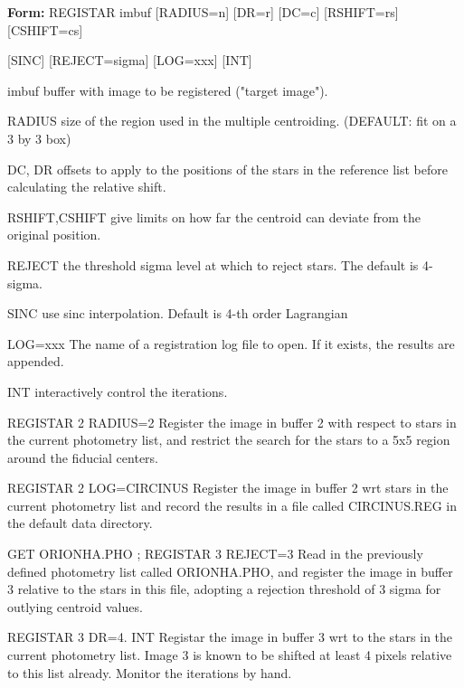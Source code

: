 {\newpage\clearpage
{}%
\begin{command}
  \item[\textbf{Form: } REGISTAR imbuf {[RADIUS=n]} {[DR=r]} {[DC=c]} 
       {[RSHIFT=rs]} {[CSHIFT=cs]}\hfill]{}
       \item{{[SINC]} {[REJECT=sigma]} {[LOG=xxx]} {[INT]}}
  \item[imbuf]{buffer with image to be registered ("target image").}
  \item[RADIUS]{size of the region used in the multiple centroiding.
       (DEFAULT: fit on a 3 by 3 box)}
  \item[DC, DR]{offsets to apply to the positions of the stars in the
       reference list before calculating the relative shift.}
  \item[RSHIFT,CSHIFT]{give limits on how far the centroid can deviate 
       from the original position.}
  \item[REJECT]{the threshold sigma level at which to reject stars. The
       default is 4-sigma.}
  \item[SINC]{use sinc interpolation. Default is 4-th order Lagrangian}
  \item[LOG=xxx]{The name of a registration log file to open.  If it exists,
       the results are appended.  }
  \item[INT]{interactively control the iterations.}
\end{command}%
\lthtmlfigureZ
\lthtmlcheckvsize\clearpage}

{\newpage\clearpage
{}%
\begin{example}
  \item[REGISTAR 2 RADIUS=2\hfill]{Register the image in buffer 2 with
       respect to stars in the current photometry list, and restrict the
       search for the stars to a 5x5 region around the fiducial centers.}
\par\item[REGISTAR 2 LOG=CIRCINUS \hfill]{Register the image in buffer 2 wrt
       stars in the current photometry list and record the results in a
       file called CIRCINUS.REG in the default data directory.}
\par\item[GET ORIONHA.PHO ; REGISTAR 3 REJECT=3\hfill]{ Read in the
       previously defined photometry list called ORIONHA.PHO, and register
       the image in buffer 3 relative to the stars in this file, adopting a
       rejection threshold of 3 sigma for outlying centroid values.}
\par\item[REGISTAR 3 DR=4. INT\hfill]{Registar the image in buffer 3 wrt to
       the stars in the current photometry list.  Image 3 is known to be
       shifted at least 4 pixels relative to this list already.  Monitor
       the iterations by hand.}
\end{example}%
\lthtmlfigureZ
\lthtmlcheckvsize\clearpage}

